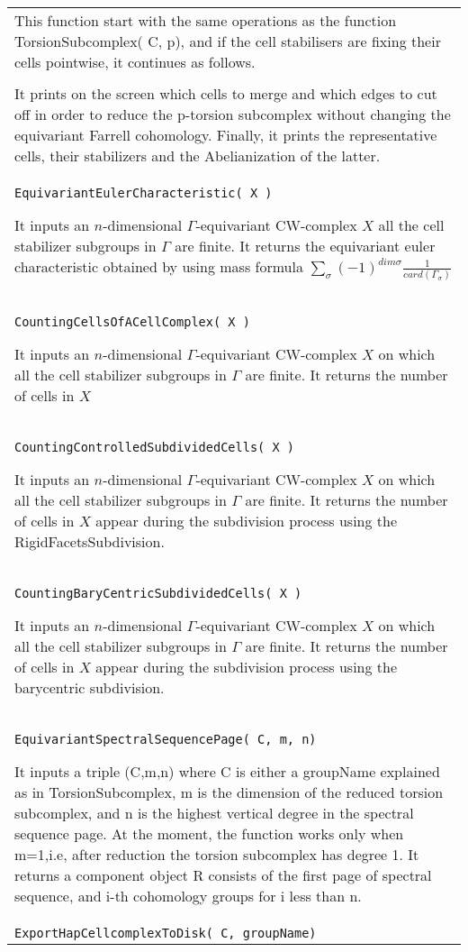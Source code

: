 \documentclass[a4paper,11pt]{report}
\begin{document}
{\begin{center}
\begin{tabular}{|l|}
 This function start with the same operations as the function
TorsionSubcomplex( C, p), and if the cell stabilisers are fixing their cells
pointwise, it continues as follows. \\
\\
 It prints on the screen which cells to merge and which edges to cut off in
order to reduce the p-torsion subcomplex without changing the equivariant
Farrell cohomology. Finally, it prints the representative cells, their
stabilizers and the Abelianization of the latter. \\
 \index{EquivariantEulerCharacteristic} \texttt{EquivariantEulerCharacteristic( X )} 

 It inputs an $n$-dimensional $\Gamma$-equivariant CW-complex $X$ all the cell stabilizer subgroups in $\Gamma$ are finite. It returns the equivariant euler characteristic obtained by using
mass formula $\sum_{\sigma}(-1)^{dim\sigma}\frac{1}{card(\Gamma_{\sigma})}$ \\
 \index{CountingCellsOfACellComplex} \texttt{CountingCellsOfACellComplex( X )} 

 It inputs an $n$-dimensional $\Gamma$-equivariant CW-complex $X$ on which all the cell stabilizer subgroups in $\Gamma$ are finite. It returns the number of cells in $X$ \\
 \index{CountingControlledSubdividedCells} \texttt{CountingControlledSubdividedCells( X )} 

 It inputs an $n$-dimensional $\Gamma$-equivariant CW-complex $X$ on which all the cell stabilizer subgroups in $\Gamma$ are finite. It returns the number of cells in $X$ appear during the subdivision process using the RigidFacetsSubdivision. \\
 \index{CountingBaryCentricSubdividedCells} \texttt{CountingBaryCentricSubdividedCells( X )} 

 It inputs an $n$-dimensional $\Gamma$-equivariant CW-complex $X$ on which all the cell stabilizer subgroups in $\Gamma$ are finite. It returns the number of cells in $X$ appear during the subdivision process using the barycentric subdivision. \\
 \index{EquivariantSpectralSequencePage} \texttt{EquivariantSpectralSequencePage( C, m, n)} 

 It inputs a triple (C,m,n) where C is either a groupName explained as in
TorsionSubcomplex, m is the dimension of the reduced torsion subcomplex, and n
is the highest vertical degree in the spectral sequence page. At the moment,
the function works only when m=1,i.e, after reduction the torsion subcomplex
has degree 1. It returns a component object R consists of the first page of
spectral sequence, and i-th cohomology groups for i less than n. \\
 \index{ExportHapCellcomplexToDisk} \texttt{ExportHapCellcomplexToDisk( C, groupName)} 


\end{tabular}
\end{center}}
\end{document}
